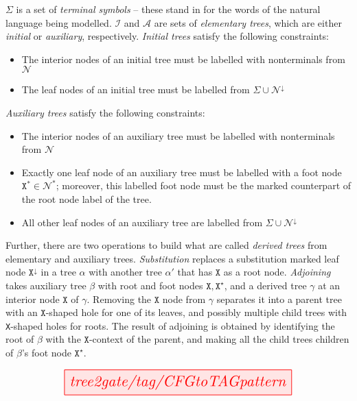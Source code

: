 $\Sigma$ is a set of \emph{terminal symbols} -- these stand in for the words of the natural language being modelled. $\mathcal{I}$ and $\mathcal{A}$ are sets of \emph{elementary trees}, which are either \emph{initial} or \emph{auxiliary}, respectively. \emph{Initial trees} satisfy the following constraints:

	\begin{itemize}
		\item{The interior nodes of an initial tree must be labelled with nonterminals from $\mathcal{N}$}
		\item{The leaf nodes of an initial tree must be labelled from $\Sigma \cup \mathcal{N}^{\downarrow}$}
	\end{itemize}
\emph{Auxiliary trees} satisfy the following constraints:
	\begin{itemize}
		\item{The interior nodes of an auxiliary tree must be labelled with nonterminals from $\mathcal{N}$}
		\item{Exactly one leaf node of an auxiliary tree must be labelled with a foot node $\texttt{X}^{*} \in \mathcal{N}^{*}$; moreover, this labelled foot node must be the marked counterpart of the root node label of the tree.}
		\item{All other leaf nodes of an auxiliary tree are labelled from $\Sigma \cup \mathcal{N}^{\downarrow}$}
	\end{itemize}

Further, there are two operations to build what are called \emph{derived trees} from elementary and auxiliary trees. \emph{Substitution} replaces a substitution marked leaf node $\texttt{X}^\downarrow$ in a tree $\alpha$ with another tree $\alpha'$ that has $\texttt{X}$ as a root node. \emph{Adjoining} takes auxiliary tree $\beta$ with root and foot nodes $\texttt{X},\texttt{X}^\star$, and a derived tree $\gamma$ at an interior node $\texttt{X}$ of $\gamma$. Removing the $\texttt{X}$ node from $\gamma$ separates it into a parent tree with an $\texttt{X}$-shaped hole for one of its leaves, and possibly multiple child trees with \texttt{X}-shaped holes for roots. The result of adjoining is obtained by identifying the root of $\beta$ with the $\texttt{X}$-context of the parent, and making all the child trees children of $\beta$'s foot node $\texttt{X}^\star$.

\newpage

\begin{figure}[h!]
\centering
\[\resizebox{0.75\textwidth}{!}{\tikzfig{tree2gate/tag/CFGtoTAGpattern}}\]
\end{figure}


